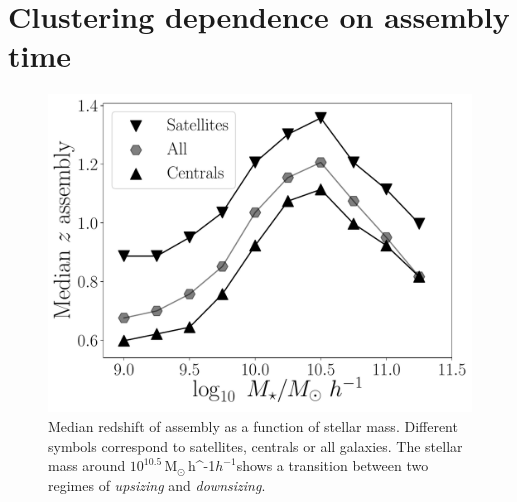 \documentclass[fleqn,usenatbib]{mnras}
\newcommand{\Msunh}{\,{\rm M}$_{\odot}$\,\ifmmode h^{-1}\else $h^{-1}$\fi}
\begin{document}
\section{Clustering dependence on assembly time}
\label{sec:results}



\begin{figure}
    \centering
    \includegraphics[width=1\columnwidth]{figuras/median_assembly.pdf}
    \caption{Median redshift of assembly as a function of stellar mass.
    Different symbols correspond to satellites, centrals or all galaxies.
    The stellar mass around $10^{10.5}$\Msunh shows a transition between two 
    regimes of \emph{upsizing} and \emph{downsizing}.}
    \label{fig:median_assembly}
\end{figure}
\end{document}
